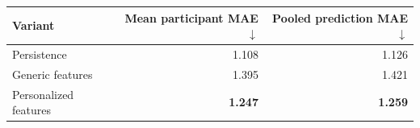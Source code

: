 \begingroup\small\setlength{\tabcolsep}{5pt}
\begin{tabular*}{\linewidth}{@{\extracolsep{\fill}}lrr}
\toprule
Variant & \shortstack{Mean participant\\MAE $\downarrow$} & \shortstack{Pooled prediction\\MAE $\downarrow$}\\
\midrule
Persistence & 1.108 & 1.126\\
Generic features & 1.395 & 1.421\\
Personalized features & \textbf{1.247} & \textbf{1.259}\\
\bottomrule
\end{tabular*}\endgroup
